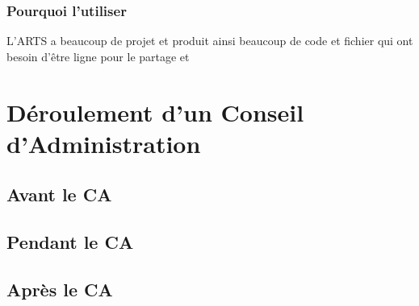 \documentclass[11pt,a4paper]{report}
\begin{document}
      \subsubsection{Pourquoi l'utiliser}
        L'ARTS a beaucoup de projet et produit ainsi beaucoup de code et fichier qui ont besoin d'être ligne pour le partage et 

  \section{Déroulement d'un Conseil d'Administration}
    \subsection{Avant le CA}
    \subsection{Pendant le CA}
    \subsection{Après le CA}
\end{document}
